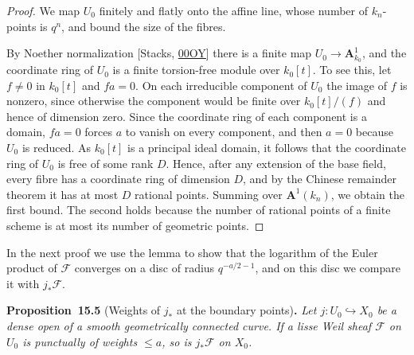 \documentclass[11pt]{article}
\newenvironment{bpstatement}[2]{\par\addvspace{0.6\baselineskip}\noindent\textbf{#1}#2\textbf{.}\enspace\ignorespaces}
  {\par\addvspace{0.4\baselineskip}}
\newenvironment{bpstatementit}[2]{\begin{bpstatement}{#1}{#2}\itshape\ignorespaces}{\end{bpstatement}}
\begin{document}
\begin{proof}[{Proof}]\label{bp11}%
We map \(U_0\) finitely and flatly onto the affine line, whose number of \(k_n\)-points is \(q^n\), and bound the size of the fibres.

By Noether normalization [Stacks, \href{https://stacks.math.columbia.edu/tag/00OY}{00OY}] there is a finite map \(U_0\to\mathbf A^1_{k_0}\), and the coordinate ring of \(U_0\) is a finite torsion-free module over \(k_0[t]\). To see this, let \(f\ne0\) in \(k_0[t]\) and \(fa=0\). On each irreducible component of \(U_0\) the image of \(f\) is nonzero, since otherwise the component would be finite over \(k_0[t]/(f)\) and hence of dimension zero. Since the coordinate ring of each component is a domain, \(fa=0\) forces \(a\) to vanish on every component, and then \(a=0\) because \(U_0\) is reduced.  As \(k_0[t]\) is a principal ideal domain, it follows that the coordinate ring of \(U_0\) is free of some rank \(D\).  Hence, after any extension of the base field, every fibre has a coordinate ring of dimension \(D\), and by the Chinese remainder theorem it has at most \(D\) rational points.  Summing over \(\mathbf A^1(k_n)\), we obtain the first bound.  The second holds because the number of rational points of a finite scheme is at most its number of geometric points.
\end{proof}

\label{bp12}%
In the next proof we use the lemma to show that the logarithm of the Euler product of \(\mathcal F\) converges on a disc of radius \(q^{-a/2-1}\), and on this disc we compare it with \(j_*\mathcal F\).

\label{bp13}%
\begin{bpstatementit}{Proposition~15.5}{ (Weights of $j_*$ at the boundary points)}
Let \(j:U_0\hookrightarrow X_0\) be a dense open of a smooth geometrically connected curve.  If a lisse Weil sheaf \(\mathcal F\) on \(U_0\) is punctually of weights \(\le a\), so is \(j_*\mathcal F\) on \(X_0\).
\end{bpstatementit}
\end{document}
